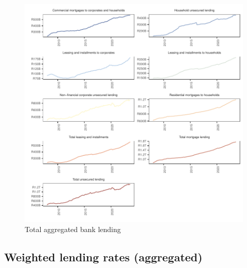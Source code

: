 \documentclass[
  letterpaper,
  DIV=11,
  numbers=noendperiod]{scrartcl}
\begin{document}
\begin{figure}[H]

{\centering \includegraphics{UP_paper_files/figure-pdf/fig-bank_lending-1.pdf}

}

\caption{\label{fig-bank_lending}Total aggregated bank lending}

\end{figure}

\hypertarget{weighted-lending-rates-aggregated}{%
\subsection{Weighted lending rates
(aggregated)}\label{weighted-lending-rates-aggregated}}
\end{document}
